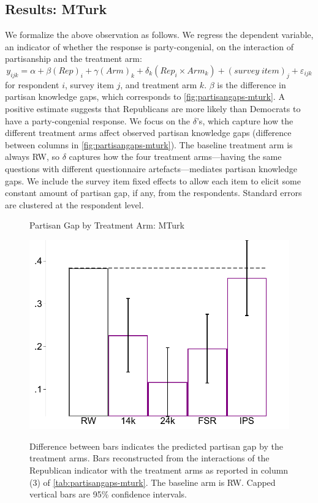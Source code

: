 \documentclass[12pt, letterpaper]{article}
\begin{document}



\subsection*{Results: MTurk}
We formalize the above observation as follows. We regress the dependent variable, an indicator of whether the response is party-congenial, on the interaction of partisanship and the treatment arm:
\begin{equation}\label{eq:partisangap-mturk}
y_{ijk} = \alpha + \beta (Rep)_i + \gamma (Arm)_k + \delta_k (Rep_i \times Arm_k) + (survey \; item)_j + \varepsilon_{ijk}
\end{equation}
for respondent $i$, survey item $j$, and treatment arm $k$. $\beta$ is the difference in partisan knowledge gaps, which corresponds to \cref{fig:partisangaps-mturk}. A positive estimate suggests that Republicans are more likely than Democrats to have a party-congenial response. We focus on the $\delta$'s, which capture how the different treatment arms affect observed partisan knowledge gaps (difference between columns in \cref{fig:partisangaps-mturk}). The baseline treatment arm is always RW, so $\delta$ captures how the four treatment arms---having the same questions with different questionnaire artefacts---mediates partisan knowledge gaps.
We include the survey item fixed effects to allow each item to elicit some constant amount of partisan gap, if any, from the respondents. Standard errors are clustered at the respondent level.

\begin{figure}[!t]
	\centering
	\caption{Partisan Gap by Treatment Arm: MTurk}
	\includegraphics[width=.55\textwidth]{../figs/mturk-pgag-surveyarms.pdf}
	\label{fig:partisangaps-mturk-reg}
	\caption*{\footnotesize 
		Difference between bars indicates the predicted partisan gap by the treatment arms. 
		Bars reconstructed from the interactions of the Republican indicator with the treatment arms as reported in column (3) of \cref{tab:partisangaps-mturk}.
		The baseline arm is RW.
		Capped vertical bars are 95\% confidence intervals.
	}
\end{figure}
\end{document}
